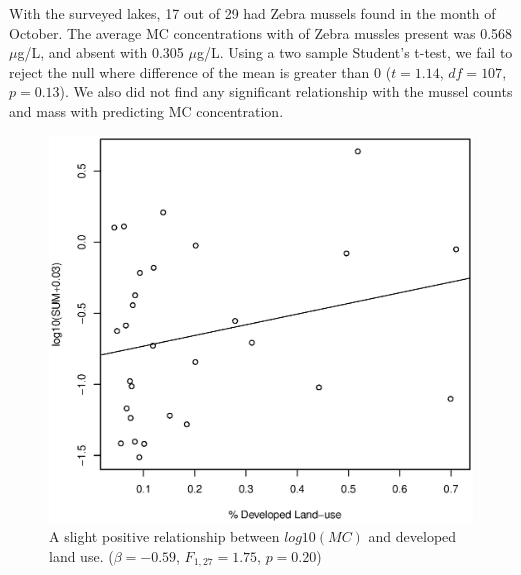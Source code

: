With the surveyed lakes, 17 out of 29 had Zebra mussels found in the month of October. The average MC concentrations with  of Zebra mussles present was 0.568 $\mu$g/L, and absent with 0.305 $\mu$g/L. Using a two sample Student's t-test, we fail to reject the null where difference of the mean is greater than 0 ($t=1.14$, $df=107$, $p=0.13$). We also did not find any significant relationship with the mussel counts and mass with predicting MC concentration.









\begin{figure}[p]
	\includegraphics[width=\textwidth]{figures/developed}
	\caption{
A slight positive relationship between $log10(MC)$ and developed land use. ($\beta=-0.59$, $F_{{1,27}}=1.75$, $p=0.20$)
}
	\label{fig:developed}
\end{figure}

